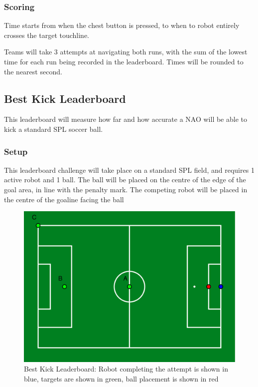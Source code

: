 \subsubsection{Scoring}
Time starts from when the chest button is pressed, to when to robot entirely crosses the target touchline.

Teams will take 3 attempts at navigating both runs, with the sum of the lowest time for each
run being recorded in the leaderboard. Times will be rounded to the nearest second.

\subsection{Best Kick Leaderboard}
This leaderboard will measure how far and how accurate a NAO will be able to kick a standard
SPL soccer ball.

\subsubsection{Setup}
This leaderboard challenge will take place on a standard SPL field, and requires 1 active robot and 1 ball.
The ball will be placed on the centre of the edge of the goal area, in line with the penalty mark.
The competing robot will be placed in the centre of the goaline facing the ball
\begin{figure}[t]
    \centerline{\includegraphics[width=\columnwidth]{figs/kick_leaderboard.pdf}}
    \caption{Best Kick Leaderboard: Robot completing the attempt is shown in blue, targets are shown in green, ball placement is shown in red}
    \label{fig:kick_leaderboard}
\end{figure}
